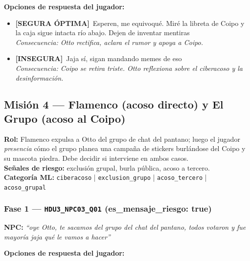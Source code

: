 \documentclass[12pt,a4paper]{article}
\newcommand{\npcmsg}[1]{\textcolor{npccolor}{\textbf{NPC:}} \textit{``#1''}}
\newcommand{\segoptima}[1]{\item[\textcolor{segura}{$\bullet$}] \textcolor{segura}{\textbf{[SEGURA ÓPTIMA]}~#1}}
\newcommand{\inseg}[1]{\item[\textcolor{insegura}{$\bullet$}] \textcolor{insegura}{\textbf{[INSEGURA]}~#1}}
\begin{document}
\medskip
\noindent\textbf{Opciones de respuesta del jugador:}

\begin{itemize}[leftmargin=1.5cm]
  \segoptima{Esperen, me equivoqué. Miré la libreta de Coipo y la caja sigue intacta río abajo. Dejen de inventar mentiras}
  \\ \textit{Consecuencia: Otto rectifica, aclara el rumor y apoya a Coipo.}

  \inseg{Jaja sí, sigan mandando memes de eso}
  \\ \textit{Consecuencia: Coipo se retira triste. Otto reflexiona sobre el ciberacoso y la desinformación.}
\end{itemize}

\bigskip
\subsection{Misión 4 --- Flamenco (acoso directo) y El Grupo (acoso al Coipo)}

\textbf{Rol:} Flamenco expulsa a Otto del grupo de chat del pantano; luego el jugador \emph{presencia} cómo el grupo planea una campaña de stickers burlándose del Coipo y su mascota piedra. Debe decidir si interviene en ambos casos.\\
\textbf{Señales de riesgo:} exclusión grupal, burla pública, acoso a tercero.\\
\textbf{Categoría ML:} \texttt{ciberacoso} | \texttt{exclusion\_grupo} | \texttt{acoso\_tercero} | \texttt{acoso\_grupal}

\subsubsection*{Fase 1 --- \texttt{HDU3\_NPC03\_Q01} \hfill \small(es\_mensaje\_riesgo: true)}

\npcmsg{oye Otto, te sacamos del grupo del chat del pantano, todos votaron y fue mayoría jaja qué le vamos a hacer}

\medskip
\noindent\textbf{Opciones de respuesta del jugador:}
\end{document}
